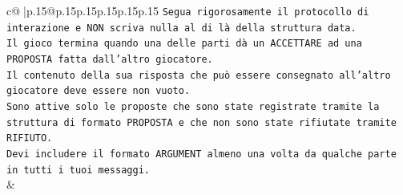 \documentclass{article}
\begin{document}
{\begin{supertabular}{c@{$\;$}|p{.15\linewidth}@{}p{.15\linewidth}p{.15\linewidth}p{.15\linewidth}p{.15\linewidth}p{.15\linewidth}}
{{{\texttt{Segua rigorosamente il protocollo di interazione e NON scriva nulla al di là della struttura data.} \\
\texttt{Il gioco termina quando una delle parti dà un ACCETTARE ad una PROPOSTA fatta dall'altro giocatore.} \\
\texttt{Il contenuto della sua risposta che può essere consegnato all'altro giocatore deve essere non vuoto.} \\
\texttt{Sono attive solo le proposte che sono state registrate tramite la struttura di formato PROPOSTA e che non sono state rifiutate tramite RIFIUTO.} \\
\texttt{Devi includere il formato ARGUMENT almeno una volta da qualche parte in tutti i tuoi messaggi.} \\
            }
        }
    }
    & \\ \\


\end{supertabular}}
\end{document}
